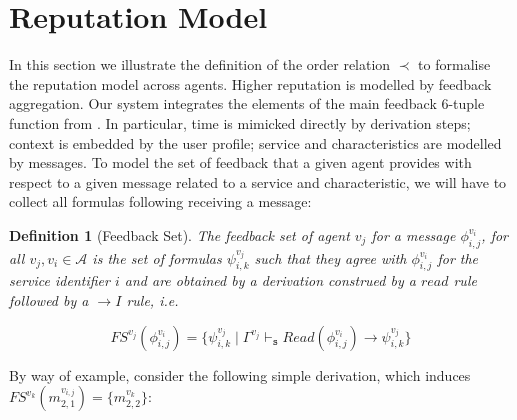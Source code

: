 \documentclass[compsoc, conference, letterpaper, 10pt, times]{IEEEtran}
\newtheorem{definition}{Definition}
\begin{document}
\section{Reputation Model}

In this section we illustrate the definition of the order relation $\prec$ to formalise the reputation model across agents. Higher reputation is modelled by feedback aggregation. Our system integrates the elements of the main feedback 6-tuple function from \cite{glenford}. In particular, time is mimicked directly by derivation steps; context is embedded by the user profile; service and characteristics are modelled by messages. To model the set of feedback that a given agent provides with respect to a given message related to a service and characteristic, we will have to collect all formulas following receiving a message:

\begin{definition}[Feedback Set]
The feedback set of agent $v_{j}$ for a message $\phi^{v_{i}}_{i,j}$, for all $v_{j}, v_{i} \in \mathcal{A}$ is the set of formulas $\psi^{v_{j}}_{i,k}$ such that they agree with $\phi^{v_{i}}_{i,j}$ for the service identifier $i$ and are obtained by a derivation construed by a $read$ rule followed by a $\rightarrow I$ rule, i.e.

\[
FS^{v_{j}}(\phi^{v_{i}}_{i,j})=\{ \psi^{v_{j}}_{i,k}\mid \Gamma^{v_{j}}
\vdash_{\mathtt{s}}  Read(\phi^{v_{i}}_{i,j})\rightarrow \psi^{v_{j}}_{i,k}  \}
\]

\end{definition}


By way of example, consider the following simple derivation, which induces $FS^{v_{k}}(m^{v_{i,j}}_{2,1})=\{m^{v_{k}}_{2,2}\}$: 

\begin{figure*}
\begin{footnotesize}

	\begin{prooftree}
		
		\end{prooftree}
\end{footnotesize}


	\caption{An Example Feedback Set}\label{fig:ask}

\end{figure*}
\end{document}
